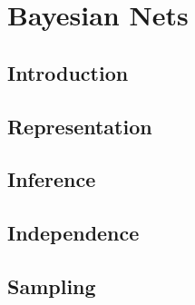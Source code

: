 \section{Bayesian Nets}

\subsection{Introduction}
\subsection{Representation}
\subsection{Inference}
\subsection{Independence}
\subsection{Sampling}

